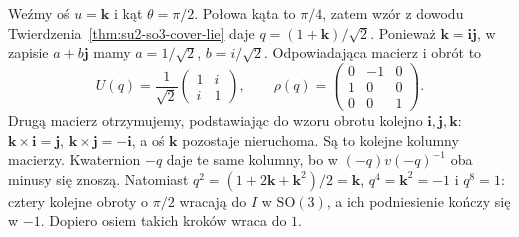 \begin{przyklad}
\label{prz:lie-obrot-kwaternion}
Weźmy oś $u=\mathbf k$ i kąt $\theta=\pi/2$.
Połowa kąta to $\pi/4$, zatem wzór z dowodu
Twierdzenia~\ref{thm:su2-so3-cover-lie} daje
$q=(1+\mathbf k)/\sqrt2$.
Ponieważ $\mathbf k=\mathbf i\mathbf j$, w zapisie $a+b\mathbf j$
mamy $a=1/\sqrt2$, $b=i/\sqrt2$.
Odpowiadająca macierz i obrót to
\[
 U(q)=\frac1{\sqrt2}\begin{pmatrix}1&i\\i&1\end{pmatrix},
 \qquad
 \rho(q)=\begin{pmatrix}0&-1&0\\1&0&0\\0&0&1\end{pmatrix}.
\]
Drugą macierz otrzymujemy, podstawiając do wzoru obrotu
kolejno $\mathbf i,\mathbf j,\mathbf k$:
$\mathbf k\times\mathbf i=\mathbf j$,
$\mathbf k\times\mathbf j=-\mathbf i$,
a oś $\mathbf k$ pozostaje nieruchoma.
Są to kolejne kolumny macierzy.
Kwaternion $-q$ daje te same kolumny, bo w
$(-q)v(-q)^{-1}$ oba minusy się znoszą.
Natomiast $q^2=(1+2\mathbf k+\mathbf k^2)/2=\mathbf k$,
$q^4=\mathbf k^2=-1$ i $q^8=1$: cztery kolejne obroty o $\pi/2$
wracają do $I$ w $\mathrm{SO}(3)$, a ich podniesienie
kończy się w $-1$. Dopiero osiem takich kroków wraca do $1$.
\end{przyklad}

